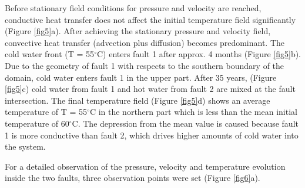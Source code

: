 Before stationary field conditions for pressure and velocity are reached, conductive heat transfer does not affect the initial temperature field significantly (Figure \ref{fig5}a). After achieving the stationary pressure and velocity field, convective heat transfer (advection plus diffusion) becomes predominant. The cold water front (T = 55$^\circ{}$C) enters fault 1 after approx. 4 months (Figure \ref{fig5}b). Due to the geometry of fault 1 with respects to the southern boundary of the domain, cold water enters fault 1 in the upper part. After 35 years, (Figure \ref{fig5}c) cold water from fault 1 and hot water from fault 2 are mixed at the fault intersection. The final temperature field (Figure \ref{fig5}d) shows an average temperature of T = 55$^\circ{}$C in the northern part which is less than the mean initial temperature of 60$^\circ{}$C. The depression from the mean value is caused because fault 1 is more conductive than fault 2, which drives higher amounts of cold water into the system.

For a detailed observation of the pressure, velocity and temperature evolution inside the two faults, three observation points were set (Figure \ref{fig6}a).


